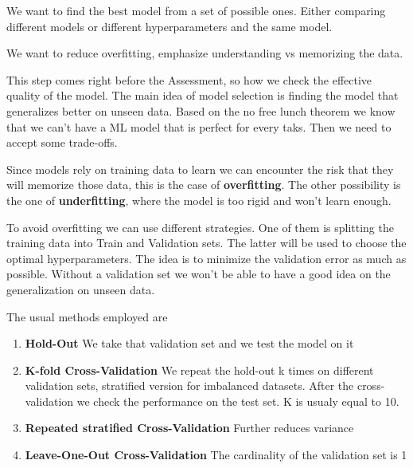 We want to find the best model from a set of possible ones. Either comparing different models or different hyperparameters and the same model.

\vspace{10pt}

We want to reduce overfitting, emphasize understanding vs memorizing the data.

This step comes right before the Assessment, so how we check the effective quality of the model.
The main idea of model selection is finding the model that generalizes better on unseen data. Based on the
no free lunch theorem we know that we can't have a ML model that is perfect for every taks. Then we need to accept some trade-offs.

\vspace{10pt}

Since models rely on training data to learn we can encounter the risk that they will memorize those data, this is the case of \textbf{overfitting}.
The other possibility is the one of \textbf{underfitting}, where the model is too rigid and won't learn enough.

\vspace{10pt}

To avoid overfitting we can use different strategies. One of them is splitting the training data into Train and Validation sets. The latter will be used to choose the optimal hyperparameters.
The idea is to minimize the validation error as much as possible. Without a validation set we won't be able to have a good idea on the generalization on unseen data.

\vspace{10pt}

The usual methods employed are
\begin{enumerate}
    \item \textbf{Hold-Out} \ra We take that validation set and we test the model on it
    \item \textbf{K-fold Cross-Validation} \ra We repeat the hold-out k times on different validation sets, stratified version for imbalanced datasets. After the cross-validation we check the performance on the test set. K is usualy equal to 10.
    \item \textbf{Repeated stratified Cross-Validation} \ra Further reduces variance
    \item \textbf{Leave-One-Out Cross-Validation} \ra The cardinality of the validation set is 1
\end{enumerate}


